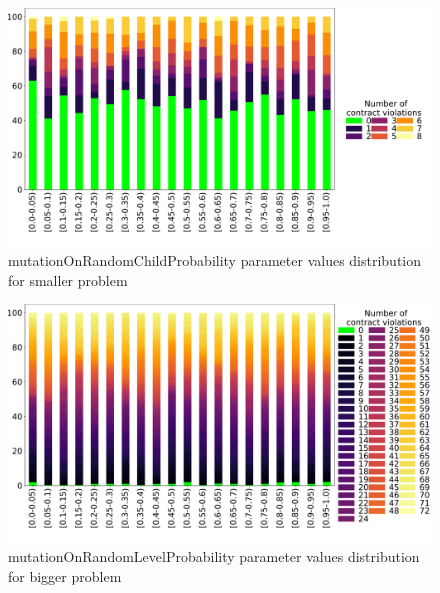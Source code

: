 \begin{figure}
	\centering
	\includegraphics[width=\textwidth]{images/DistrValiditySmall/mutationOnRandomChildProbability.pdf}
	\caption[mutationOnRandomChildProbability parameter values distribution for smaller problem]{mutationOnRandomChildProbability parameter values distribution for smaller problem}
	\label{fig:mutationOnRandomChildProbability_DistSmall}
\end{figure}
\begin{figure}
	\centering
	\includegraphics[width=\textwidth]{images/DistrValidityBig/mutationOnRandomLevelProbability.pdf}
	\caption[mutationOnRandomLevelProbability parameter values distribution for bigger problem]{mutationOnRandomLevelProbability parameter values distribution for bigger problem}
	\label{fig:mutationOnRandomLevelProbability_DistBig}
\end{figure}
